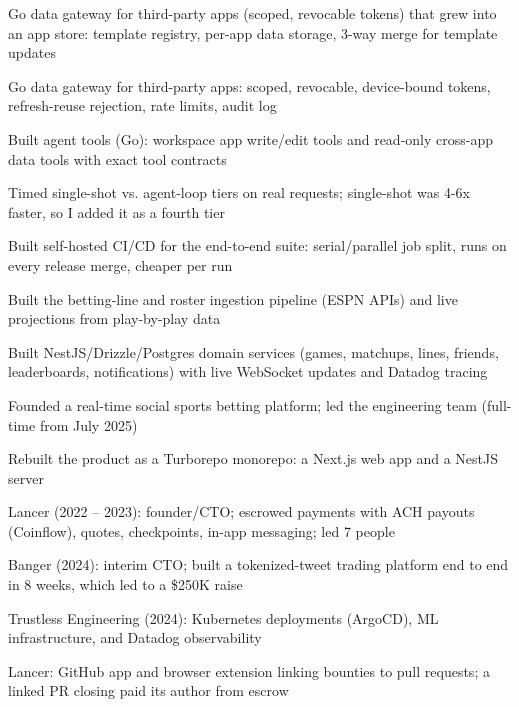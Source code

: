 \documentclass[print]{jack-resume}
\begin{document}
\begin{tightemize}
    \item Go data gateway for third-party apps (scoped, revocable tokens) that grew into an app store: template registry, per-app data storage, 3-way merge for template updates
    \item Go data gateway for third-party apps: scoped, revocable, device-bound tokens, refresh-reuse rejection, rate limits, audit log
    \item Built agent tools (Go): workspace app write/edit tools and read-only cross-app data tools with exact tool contracts
    \item Timed single-shot vs. agent-loop tiers on real requests; single-shot was 4-6x faster, so I added it as a fourth tier
    \item Built self-hosted CI/CD for the end-to-end suite: serial/parallel job split, runs on every release merge, cheaper per run
\end{tightemize}
\sectionsep

\begin{tightemize}
    \item Built the betting-line and roster ingestion pipeline (ESPN APIs) and live projections from play-by-play data
    \item Built NestJS/Drizzle/Postgres domain services (games, matchups, lines, friends, leaderboards, notifications) with live WebSocket updates and Datadog tracing
    \item Founded a real-time social sports betting platform; led the engineering team (full-time from July 2025)
    \item Rebuilt the product as a Turborepo monorepo: a Next.js web app and a NestJS server
\end{tightemize}
\sectionsep

\begin{tightemize}
    \item Lancer (2022 -- 2023): founder/CTO; escrowed payments with ACH payouts (Coinflow), quotes, checkpoints, in-app messaging; led 7 people
    \item Banger (2024): interim CTO; built a tokenized-tweet trading platform end to end in 8 weeks, which led to a \$250K raise
    \item Trustless Engineering (2024): Kubernetes deployments (ArgoCD), ML infrastructure, and Datadog observability
    \item Lancer: GitHub app and browser extension linking bounties to pull requests; a linked PR closing paid its author from escrow
\end{tightemize}
\sectionsep
\end{document}
